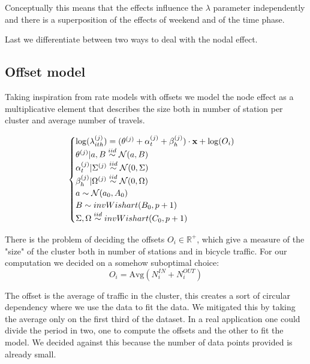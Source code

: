 \documentclass[11pt,twoside]{report}
\begin{document}
Conceptually this means that the effects influence the $\lambda$ parameter independently and there is a superposition of the effects of weekend and of the time phase.

Last we differentiate between two ways to deal with the nodal effect. 

\subsection{Offset model}
Taking inspiration from rate models with offsets we model the node effect as a multiplicative element that describes the size both in number of station per cluster and average number of travels. %

\begin{equation}
\begin{cases}
\log(\lambda^{(j)}_{ith}) = (\boldmath{\theta^{(j)} +  \alpha^{(j)}_{t} + \beta_{h}^{(j)})}\cdot\mathbf{x} + \log(O_i)\\
\theta^{(j)}|a,B \stackrel{iid}{\sim} \mathcal{N}(a,B)\\
\alpha_{t}^{(j)}|\Sigma^{(j)} \stackrel{iid}{\sim} \mathcal{N}(0, \Sigma)\\
\beta_{h}^{(j)}|\Omega^{(j)} \stackrel{iid}{\sim} \mathcal{N}(0, \Omega)\\
a \sim \mathcal{N}(a_0, A_0)\\
B \sim invWishart(B_0, p+1)\\
\Sigma, \Omega \stackrel{iid}{\sim} invWishart(C_0, p+1)

\end{cases}
\end{equation}


There is the problem of deciding the offsets $O_i \in \mathbb{R}^+$, which give a measure of the "size" of the cluster both in number of stations and in bicycle traffic. For our computation we decided on a somehow suboptimal choice: 
$$O_i = \mathrm{Avg}(N^{IN}_i + N^{OUT}_i)$$

The offset is the average of traffic in the cluster, this creates a sort of circular dependency where we use the data to fit the data. We mitigated this by taking the average only on the first third of the dataset. In a real application one could divide the period in two, one to compute the offsets and the other to fit the model. We decided against this because the number of data points provided is already small.
\end{document}
